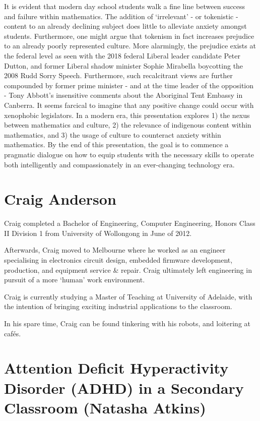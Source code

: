 \documentclass[twoside,12pt,a4paper,notitlepage]{memoir}
\begin{document}
It is evident that modern day school students walk a fine line between success and failure within mathematics. The addition of ‘irrelevant’ - or tokenistic - content to an already declining subject does little to alleviate anxiety amongst students. Furthermore, one might argue that tokenism in fact increases prejudice to an already poorly represented culture.
More alarmingly, the prejudice exists at the federal level as seen with the 2018 federal Liberal leader candidate Peter Dutton, and former Liberal shadow minister Sophie Mirabella boycotting the 2008 Rudd Sorry Speech. Furthermore, such recalcitrant views are further compounded by former prime minister - and at the time leader of the opposition - Tony Abbott’s insensitive comments about the Aboriginal Tent Embassy in Canberra. It seems farcical to imagine that any positive change could occur with xenophobic legislators.
In a modern era, this presentation explores 1) the nexus between mathematics and culture, 2) the relevance of indigenous content within mathematics, and 3) the usage of culture to counteract anxiety within mathematics. By the end of this presentation, the goal is to commence a pragmatic dialogue on how to equip students with the necessary skills to operate both intelligently and compassionately in an ever-changing technology era.

\section*{Craig Anderson}

Craig completed a Bachelor of Engineering, Computer Engineering, Honors Class II Division 1 from University of Wollongong in June of 2012.

Afterwards, Craig moved to Melbourne where he worked as an engineer specialising in electronics circuit design, embedded firmware development, production, and equipment service \& repair. Craig ultimately left engineering in pursuit of a more ‘human’ work environment.

Craig is currently studying a Master of Teaching at University of Adelaide, with the intention of bringing exciting industrial applications to the classroom.

In his spare time, Craig can be found tinkering with his robots, and loitering at cafés.


\pagebreak
\section*{Attention Deficit Hyperactivity Disorder (ADHD) in a Secondary Classroom (Natasha Atkins)}
\label{aut:atkins}
\end{document}
